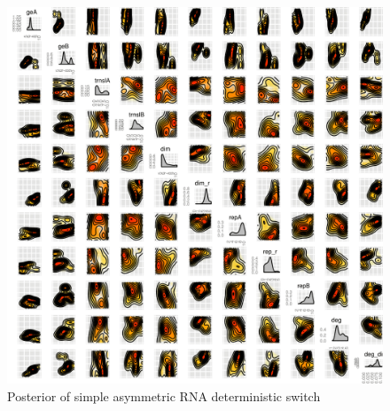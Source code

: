 \begin{figure}[htbp]
\begin{center}
\includegraphics[scale=0.15]{chapterModelling/mass_action_switches/deterministic/asym/posterior_cl_rna.png}
\caption{Posterior of simple asymmetric RNA deterministic switch}\label{fig:asym_det_cl_rna_ma_post}
\end{center}
\end{figure}




